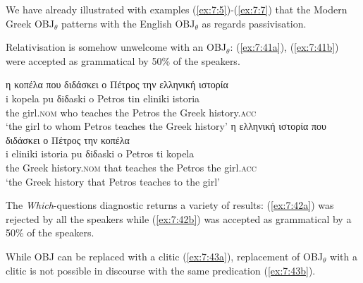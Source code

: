 \documentclass[output=paper]{langsci/langscibook}
\begin{document}
We have already illustrated with examples (\ref{ex:7:5})-(\ref{ex:7:7}) that the Modern Greek OBJ$_\theta$ patterns with the English  OBJ$_\theta$ as regards passivisation. 

Relativisation is somehow unwelcome with an OBJ$_\theta$: (\ref{ex:7:41a}), (\ref{ex:7:41b}) were accepted as grammatical by  50\% of the speakers.

\ea%
\label{ex:7:41}
\ea \label{ex:7:41a}
\glll η κοπέλα που διδάσκει ο Πέτρος την ελληνική ιστορία\\
i kopela pu δiδaski o Petros tin eliniki istoria\\
     the girl.\textsc{nom}  who teaches the Petros the Greek history.\textsc{acc}\\
\glt `the girl to whom Petros teaches the Greek history'
\ex \label{ex:7:41b}
\glll η ελληνική ιστορία που διδάσκει ο Πέτρος την κοπέλα\\
i eliniki istoria pu δiδaski o Petros ti kopela\\
     the Greek history.\textsc{nom} that teaches the Petros the  girl.\textsc{acc}\\
\glt `the Greek history that Petros teaches to the girl'
\z
\z

The \textit{Which}-questions diagnostic returns a variety of results: (\ref{ex:7:42a}) was rejected by all the speakers while (\ref{ex:7:42b}) was accepted as grammatical by a 50\% of the speakers.

\ea%
\label{ex:7:42}
\z
\z

While OBJ can be replaced with a clitic (\ref{ex:7:43a}), replacement of OBJ$_\theta$ with a clitic is not possible in discourse with the same predication (\ref{ex:7:43b}).

\ea%
\label{ex:7:43}
\z
\z
\end{document}
